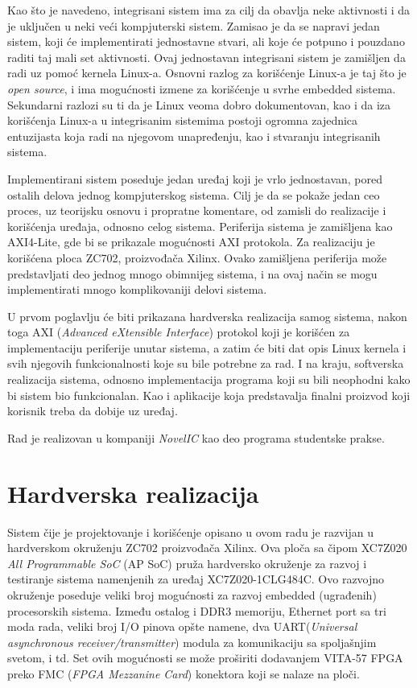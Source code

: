 \documentclass[a4paper, 12pt, diplomski]{etf}
\begin{document}
		Kao što je navedeno, integrisani sistem ima za cilj da obavlja neke aktivnosti i da je uključen u neki veći kompjuterski sistem. Zamisao je da se napravi jedan sistem, koji će implementirati jednostavne stvari, ali koje će potpuno i pouzdano raditi taj mali set aktivnosti. Ovaj jednostavan integrisani sistem je zamišljen da radi uz pomoć kernela Linux-a. Osnovni razlog za korišćenje Linux-a je taj što je \textit{open source}, i ima mogućnosti izmene za korišćenje u svrhe embedded sistema. Sekundarni razlozi su ti da je Linux veoma dobro dokumentovan, kao i da iza korišćenja Linux-a u integrisanim sistemima postoji ogromna zajednica entuzijasta koja radi na njegovom unapređenju, kao i stvaranju integrisanih sistema.

		Implementirani sistem poseduje jedan uređaj koji je vrlo jednostavan, pored ostalih delova jednog kompjuterskog sistema. Cilj je da se pokaže jedan ceo proces, uz teorijsku osnovu i propratne komentare, od zamisli do realizacije i korišćenja uređaja, odnosno celog sistema. Periferija sistema je zamišljena kao AXI4-Lite, gde bi se prikazale mogućnosti AXI protokola. Za realizaciju je korišćena ploca ZC702, proizvođača Xilinx. Ovako zamišljena periferija može predstavljati deo jednog mnogo obimnijeg sistema, i na ovaj način se mogu implementirati mnogo komplikovaniji delovi sistema.

		U prvom poglavlju će biti prikazana hardverska realizacija samog sistema, nakon toga AXI (\textit{Advanced eXtensible Interface}) protokol koji je korišćen za implementaciju periferije unutar sistema, a zatim će biti dat opis Linux kernela i svih njegovih funkcionalnosti koje su bile potrebne za rad. I na kraju, softverska realizacija sistema, odnosno implementacija programa koji su bili neophodni kako bi sistem bio funkcionalan.	Kao i aplikacije koja predstavalja finalni proizvod koji korisnik treba da dobije uz uređaj.

		Rad je realizovan u kompaniji \textit{NovelIC} kao deo programa studentske prakse.

	\newpage

	\chapter{Hardverska realizacija}

	Sistem čije je projektovanje i korišćenje opisano u ovom radu je razvijan u hardverskom okruženju ZC702 proizvođača Xilinx. Ova ploča sa čipom XC7Z020 \textit{All Programmable SoC} (AP SoC) pruža hardversko okruženje za razvoj i testiranje sistema namenjenih za uređaj XC7Z020-1CLG484C. Ovo razvojno okruženje poseduje veliki broj mogućnosti za razvoj embedded (ugrađenih) procesorskih sistema. Između ostalog i DDR3 memoriju, Ethernet port sa tri moda rada, veliki broj I/O pinova opšte namene, dva UART(\textit{Universal asynchronous receiver/transmitter}) modula za komunikaciju sa spoljašnjim svetom, i td. Set ovih mogućnosti se može proširiti dodavanjem VITA-57 FPGA preko FMC (\textit{FPGA Mezzanine Card}) konektora koji se nalaze na ploči.\cite{lit2}
\end{document}
